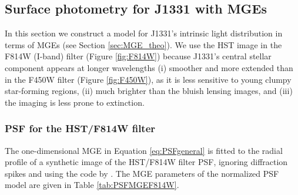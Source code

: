 \documentclass[useAMS,usenatbib]{mnras}
\begin{document}
\subsection{Surface photometry for J1331 with MGEs} \label{sec:MGE_results}

In this section we construct a model for J1331's intrinsic light distribution in terms of MGEs (see Section \ref{sec:MGE_theo}). We use the HST image in the F814W (I-band) filter (Figure \ref{fig:F814W}) because J1331's central stellar component appears at longer wavelengths (i) smoother and more extended than in the F450W filter (Figure \ref{fig:F450W}), as it is less sensitive to young clumpy star-forming regions, (ii) much brighter than the bluish lensing images, and (iii) the imaging is less prone to extinction.

\subsubsection{PSF for the HST/F814W filter}

The one-dimensional MGE in Equation \eqref{eq:PSFgeneral} is fitted to the radial profile of a synthetic image of the HST/F814W filter PSF, ignoring diffraction spikes and using the code by \citet{Cap02}. The MGE parameters of the normalized PSF model are given in Table \ref{tab:PSFMGEF814W}.
\end{document}
